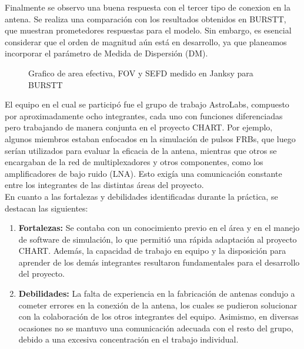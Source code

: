 Finalmente se observo una buena respuesta con el tercer tipo de conexion en la antena. Se realiza una comparación con los resultados obtenidos en BURSTT, que muestran prometedores respuestas para el modelo. Sin embargo, es esencial considerar que el orden de magnitud aún está en desarrollo, ya que planeamos incorporar el parámetro de Medida de Dispersión (DM).
\begin{figure}[H]
    \centering
    \quad
    \caption{Grafico de area efectiva, FOV y SEFD medido en Janksy para BURSTT}
    \label{fig:example}
\end{figure}
El equipo en el cual se participó fue el grupo de trabajo AstroLabs, compuesto por aproximadamente ocho integrantes, cada uno con funciones diferenciadas pero trabajando de manera conjunta en el proyecto CHART. Por ejemplo, algunos miembros estaban enfocados en la simulación de pulsos FRBs, que luego serían utilizados para evaluar la eficacia de la antena, mientras que otros se encargaban de la red de multiplexadores y otros componentes, como los amplificadores de bajo ruido (LNA). Esto exigía una comunicación constante entre los integrantes de las distintas áreas del proyecto.\\

En cuanto a las fortalezas y debilidades identificadas durante la práctica, se destacan las siguientes:
\begin{enumerate}
    \item \textbf{Fortalezas:} Se contaba con un conocimiento previo en el área y en el manejo de software de simulación, lo que permitió una rápida adaptación al proyecto CHART. Además, la capacidad de trabajo en equipo y la disposición para aprender de los demás integrantes resultaron fundamentales para el desarrollo del proyecto.
    \item \textbf{Debilidades:} La falta de experiencia en la fabricación de antenas condujo a cometer errores en la conexión de la antena, los cuales se pudieron solucionar con la colaboración de los otros integrantes del equipo. Asimismo, en diversas ocasiones no se mantuvo una comunicación adecuada con el resto del grupo, debido a una excesiva concentración en el trabajo individual.
\end{enumerate}
\newpage
